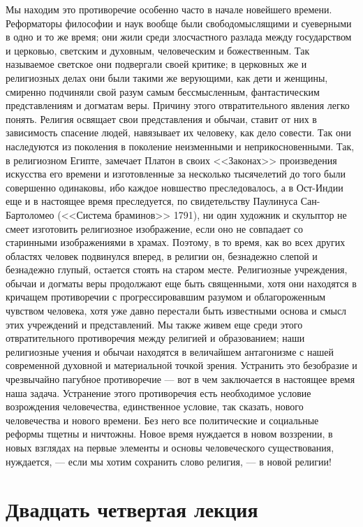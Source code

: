 \documentclass[12pt]{article}
\begin{document}
Мы находим это противоречие особенно часто в начале новейшего времени. Реформаторы философии и наук вообще были свободомыслящими и суеверными в одно и то же время; они жили среди злосчастного разлада между государством и церковью, светским и духовным, человеческим и божественным. Так называемое светское они подвергали своей критике; в церковных же и религиозных делах они были такими же верующими, как дети и женщины, смиренно подчиняли свой разум самым бессмысленным, фантастическим представлениям и догматам веры. Причину этого отвратительного явления легко понять. Религия освящает свои представления и обычаи, ставит от них в зависимость спасение людей, навязывает их человеку, как дело совести. Так они наследуются из поколения в поколение неизменными и неприкосновенными. Так, в религиозном Египте, замечает Платон в своих <<Законах>>  произведения искусства его времени и изготовленные за несколько тысячелетий до того были совершенно одинаковы, ибо каждое новшество преследовалось, а в Ост-Индии еще и в настоящее время преследуется, по свидетельству Паулинуса Сан-Бартоломео (<<Система браминов>>  1791), ни один художник и скульптор не смеет изготовить религиозное изображение, если оно не совпадает со старинными изображениями в храмах. Поэтому, в то время, как во всех других областях человек подвинулся вперед, в религии он, безнадежно слепой и безнадежно глупый, остается стоять на старом месте. Религиозные учреждения, обычаи и догматы веры продолжают еще быть священными, хотя они находятся в кричащем противоречии с прогрессировавшим разумом и облагороженным чувством человека, хотя уже давно перестали быть известными основа и смысл этих учреждений и представлений. Мы также живем еще среди этого отвратительного противоречия между религией и образованием; наши религиозные учения и обычаи находятся в величайшем антагонизме с нашей современной духовной и материальной точкой зрения. Устранить это безобразие и чрезвычайно пагубное противоречие --- вот в чем заключается в настоящее время наша задача. Устранение этого противоречия есть необходимое условие возрождения человечества, единственное условие, так сказать, нового человечества и нового времени. Без него все политические и социальные реформы тщетны и ничтожны. Новое время нуждается в новом воззрении, в новых взглядах на первые элементы и основы человеческого существования, нуждается, --- если мы хотим сохранить слово религия, --- в новой религии! 

\section*{Двадцать четвертая лекция}
\end{document}

